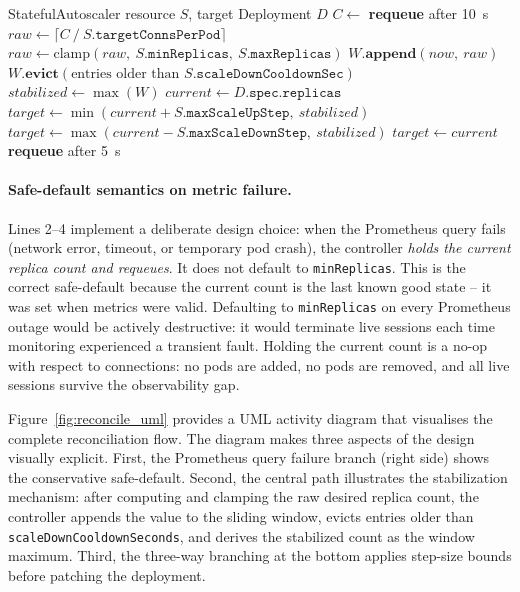\documentclass[twocolumn]{svjour3}
\begin{document}
\begin{algorithm}[ht]
\caption{\texttt{StatefulAutoscaler} Reconciliation Logic}
\label{alg:reconcile}
\begin{algorithmic}[1]
\Require StatefulAutoscaler resource $S$, target Deployment $D$
\State $C \gets$ 
    \State \textbf{requeue} after 10~s 
    \State \Return
\EndIf
\State $raw \gets \lceil C\ /\ S.\texttt{targetConnsPerPod} \rceil$
\State $raw \gets \text{clamp}(raw,\ S.\texttt{minReplicas},\ S.\texttt{maxReplicas})$
\State $W.\textbf{append}(now,\ raw)$ 
\State $W.\textbf{evict}(\text{entries older than } S.\texttt{scaleDownCooldownSec})$
\State $stabilized \gets \max(W)$ 
\State $current \gets D.\texttt{spec.replicas}$
    \State $target \gets \min(current + S.\texttt{maxScaleUpStep},\ stabilized)$
    \State $target \gets \max(current - S.\texttt{maxScaleDownStep},\ stabilized)$
\Else
    \State $target \gets current$
\EndIf
\State {}
\State \textbf{requeue} after 5~s
\end{algorithmic}
\end{algorithm}

\paragraph{Safe-default semantics on metric failure.}
Lines 2--4 implement a deliberate design choice: when the Prometheus query fails (network
error, timeout, or temporary pod crash), the controller \textit{holds the current replica
count and requeues}. It does not default to \texttt{minReplicas}. This is the correct
safe-default because the current count is the last known good state -- it was set when
metrics were valid. Defaulting to \texttt{minReplicas} on every Prometheus outage would be
actively destructive: it would terminate live sessions each time monitoring experienced a
transient fault. Holding the current count is a no-op with respect to connections: no pods
are added, no pods are removed, and all live sessions survive the observability gap.

Figure~\ref{fig:reconcile_uml} provides a UML activity diagram that visualises the complete
reconciliation flow. The diagram makes three aspects of the design visually explicit. First, the
Prometheus query failure branch (right side) shows the conservative safe-default. Second, the
central path illustrates the stabilization mechanism: after computing and clamping the raw
desired replica count, the controller appends the value to the sliding window, evicts
entries older than \texttt{scaleDownCooldownSeconds}, and derives the stabilized count as the
window maximum. Third, the three-way branching at the bottom applies step-size bounds
before patching the deployment.
\end{document}
